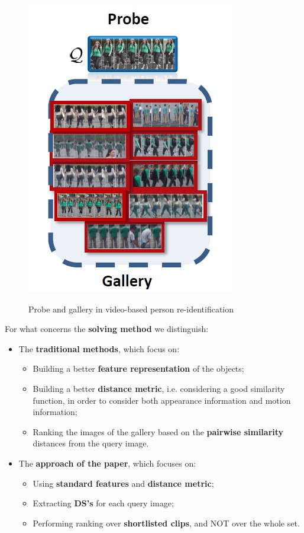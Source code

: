 \begin{figure}[h!]
    \centering
    \includegraphics[scale = 1.5]{img/camera2.jpg}
    \label{camera2}
    \caption{Probe and gallery in video-based person re-identification}
\end{figure}

For what concerns the \textbf{solving method} we distinguish:

\begin{itemize}
    \item The \textbf{traditional methods}, which focus on:
    \begin{itemize}
        \item Building a better \textbf{feature representation} of the objects;
        \item Building a better \textbf{distance metric}, i.e. considering a good similarity function, in order to consider both appearance information and motion information;
        \item Ranking the images of the gallery based on the \textbf{pairwise similarity} distances from the query image.
    \end{itemize}
    \item The \textbf{approach of the paper}, which focuses on:
    \begin{itemize}
        \item Using \textbf{standard features} and \textbf{distance metric};
        \item Extracting \textbf{DS's} for each query image;
        \item Performing ranking over \textbf{shortlisted clips}, and NOT over the whole set.
    \end{itemize}
\end{itemize}

